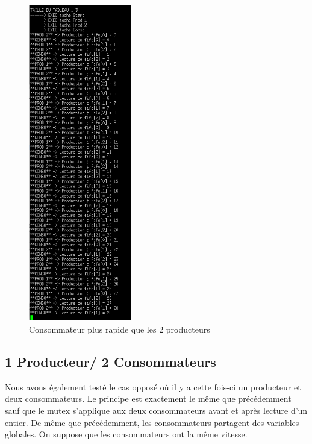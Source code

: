 \documentclass[a4paper,12pt]{report}
\begin{document}
\begin{figure}[h]
	\centering
		\includegraphics[width=0.4\textwidth]{screens/conso_plus_rapide_sem_2prod_meme_vitesse_1conso.png}
		\caption{Consommateur plus rapide que les 2 producteurs}
		\label{conso_plus_rapide_sem_2prod_meme_vitesse_1conso}
\end{figure}

\newpage

\subsection{1 Producteur/ 2 Consommateurs}

Nous avons également testé le cas opposé où il y a cette fois-ci un producteur et deux consommateurs. Le principe est exactement le même que précédemment sauf que le mutex s'applique aux deux consommateurs avant et après lecture d'un entier. De même que précédemment, les consommateurs partagent des variables globales. On suppose que les consommateurs ont la même vitesse.\newline
\end{document}

